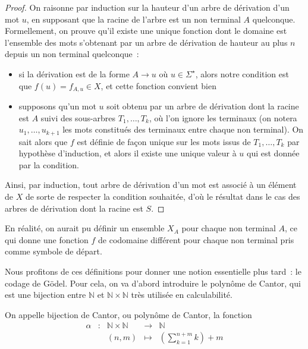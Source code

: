 \begin{proof}
  On raisonne par induction sur la hauteur d'un arbre de dérivation d'un mot
  $u$, en supposant que la racine de l'arbre est un non terminal $A$
  quelconque. Formellement, on prouve qu'il existe une unique fonction dont
  le domaine est l'ensemble des mots s'obtenant par un arbre de dérivation de
  hauteur au plus $n$ depuis un non terminal quelconque~:
  \begin{itemize}
  \item si la dérivation est de la forme $A \to u$ où $u\in\Sigma^\star$, alors
    notre condition est que $f(u) = f_{A,u} \in X$, et cette fonction convient
    bien
  \item supposons qu'un mot $u$ soit obtenu par un arbre de dérivation dont la
    racine est $A$ suivi des sous-arbres $T_1,\ldots,T_k$, où l'on ignore les
    terminaux (on notera $u_1,\ldots,u_{k+1}$ les mots constitués des terminaux
    entre chaque non terminal). On sait alors que $f$ est définie de façon
    unique sur les mots issus de $T_1,\ldots,T_k$ par hypothèse d'induction, et
    alors il existe une unique valeur à $u$ qui est donnée par la condition.
  \end{itemize}

  Ainsi, par induction, tout arbre de dérivation d'un mot est associé à un
  élément de $X$ de sorte de respecter la condition souhaitée, d'où le
  résultat dans le cas des arbres de dérivation dont la racine est $S$.
\end{proof}

\begin{remark}
  En réalité, on aurait pu définir un ensemble $X_A$ pour chaque non terminal
  $A$, ce qui donne une fonction $f$ de codomaine différent pour chaque
  non terminal pris comme symbole de départ.
\end{remark}

Nous profitons de ces définitions pour donner une notion essentielle plus tard~:
le codage de Gödel. Pour cela, on va d'abord introduire le polynôme de Cantor,
qui est une bijection entre $\mathbb N$ et $\mathbb N\times\mathbb N$ très
utilisée en calculabilité.

\begin{definition}\label{def.bij.Cantor}
  On appelle bijection de Cantor, ou polynôme de Cantor, la fonction
  \[\begin{array}{ccccc}
  \alpha & : & \mathbb N \times \mathbb N & \longrightarrow & \mathbb N\\
  & & (n,m) & \displaystyle\longmapsto & \left(\sum_{k = 1}^{n+m} k\right)+m
  \end{array}\]
\end{definition}

